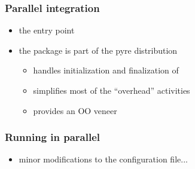 \begin{frame}[fragile]
%
  \frametitle{Parallel integration}
%
  \begin{itemize}
%
  \item the  entry point
%
%
  \item the  package is part of the pyre distribution
    \begin{itemize}
    \item handles initialization and finalization of 
    \item simplifies most of the ``overhead'' activities
    \item provides an OO veneer
    \end{itemize}
%
  \end{itemize}
%
\end{frame}

\begin{frame}[fragile]
%
  \frametitle{Running in parallel}
%
  \begin{itemize}
%
  \item minor modifications to the configuration file...
%
%
  \end{itemize}
%
\end{frame}


